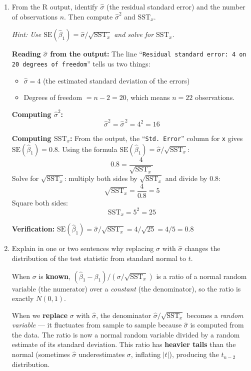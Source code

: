 \documentclass[11pt,a4paper]{article}
\begin{document}
\begin{enumerate}[label=(\alph*)]
\item From the R output, identify $\hat{\sigma}$ (the residual standard error) and the number of observations $n$. Then compute $\hat{\sigma}^2$ and $\text{SST}_x$.

\textcolor{hintcolor}{\emph{Hint: Use $\text{SE}(\hat{\beta}_1) = \hat{\sigma}/\sqrt{\text{SST}_x}$ and solve for $\text{SST}_x$.}}

\begin{solution}
\textbf{Reading $\hat{\sigma}$ from the output:} The line ``\texttt{Residual standard error: 4 on 20 degrees of freedom}'' tells us two things:
\begin{itemize}
  \item $\hat{\sigma} = 4$ (the estimated standard deviation of the errors)
  \item Degrees of freedom $= n - 2 = 20$, which means $n = 22$ observations.
\end{itemize}

\textbf{Computing $\hat{\sigma}^2$:}
\[
  \hat{\sigma}^2 = \hat{\sigma}^{\,2} = 4^2 = \boxed{16}
\]

\textbf{Computing $\text{SST}_x$:} From the output, the ``\texttt{Std.\ Error}'' column for \verb!x! gives $\text{SE}(\hat{\beta}_1) = 0.8$. Using the formula $\text{SE}(\hat{\beta}_1) = \hat{\sigma}/\sqrt{\text{SST}_x}$:
\[
  0.8 = \frac{4}{\sqrt{\text{SST}_x}}
\]
Solve for $\sqrt{\text{SST}_x}$: multiply both sides by $\sqrt{\text{SST}_x}$ and divide by $0.8$:
\[
  \sqrt{\text{SST}_x} = \frac{4}{0.8} = 5
\]
Square both sides:
\[
  \text{SST}_x = 5^2 = \boxed{25}
\]

\textbf{Verification:} $\text{SE}(\hat{\beta}_1) = \hat{\sigma}/\sqrt{\text{SST}_x} = 4/\sqrt{25} = 4/5 = 0.8$ \checkmark
\end{solution}

\item Explain in one or two sentences why replacing $\sigma$ with $\hat{\sigma}$ changes the distribution of the test statistic from standard normal to $t$.

\begin{solution}
When $\sigma$ is \textbf{known}, $(\hat{\beta}_1 - \beta_1)/(\sigma/\sqrt{\text{SST}_x})$ is a ratio of a normal random variable (the numerator) over a \emph{constant} (the denominator), so the ratio is exactly $N(0,1)$.

When we \textbf{replace} $\sigma$ with $\hat{\sigma}$, the denominator $\hat{\sigma}/\sqrt{\text{SST}_x}$ becomes a \emph{random variable} --- it fluctuates from sample to sample because $\hat{\sigma}$ is computed from the data. The ratio is now a normal random variable divided by a random estimate of its standard deviation. This ratio has \textbf{heavier tails} than the normal (sometimes $\hat{\sigma}$ underestimates $\sigma$, inflating $|t|$), producing the $t_{n-2}$ distribution.


\end{solution}
\end{enumerate}
\end{document}
